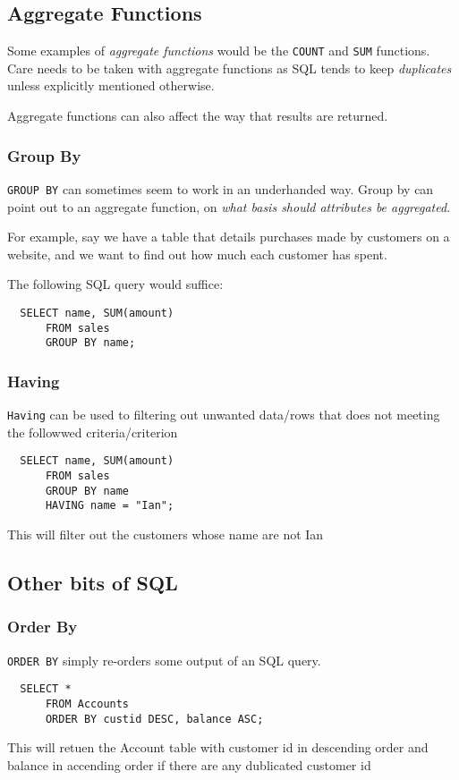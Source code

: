 \documentclass{article}
\begin{document}
\filbreak
\subsection{Aggregate Functions}

Some examples of \textit{aggregate functions} would be the \texttt{COUNT} and \texttt{SUM} functions. Care needs to be taken with aggregate functions as SQL tends to keep \textit{duplicates} unless explicitly mentioned otherwise.

Aggregate functions can also affect the way that results are returned.

\subsubsection*{Group By}

\texttt{GROUP BY} can sometimes seem to work in an underhanded way. Group by can point out to an aggregate function, on \textit{what basis should attributes be aggregated}.

For example, say we have a table that details purchases made by customers on a website, and we want to find out how much each customer has spent.

The following SQL query would suffice:

\begin{lstlisting}
  SELECT name, SUM(amount)
      FROM sales
      GROUP BY name;
\end{lstlisting}

\subsubsection*{Having}
\texttt{Having} can be used to filtering out unwanted data/rows that does not meeting the followwed criteria/criterion
\begin{lstlisting}
  SELECT name, SUM(amount)
      FROM sales
      GROUP BY name
      HAVING name = "Ian";
\end{lstlisting}
This will filter out the customers whose name are not Ian

\subsection{Other bits of SQL}
\subsubsection*{Order By}

\texttt{ORDER BY} simply re-orders some output of an SQL query.
\begin{lstlisting}
  SELECT *
      FROM Accounts
      ORDER BY custid DESC, balance ASC;
\end{lstlisting}
This will retuen the Account table with customer id in descending order and balance in accending order if there are any dublicated customer id
\end{document}
